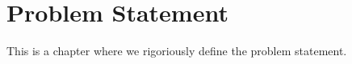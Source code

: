 \chapter{Problem Statement}
\label{chapter:problem}

This is a chapter where we rigoriously define the problem statement.
